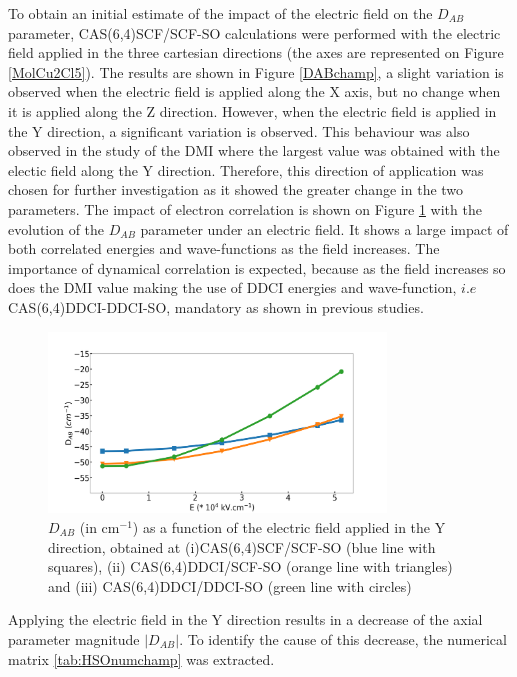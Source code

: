 \documentclass[10pt]{report}
\numberwithin{equation}{section}
\begin{document}
To obtain an initial estimate of the impact of the electric field on the $D_{AB}$ parameter, CAS(6,4)SCF/SCF-SO calculations were performed with the electric field applied in the three cartesian directions (the axes are represented on Figure \ref{MolCu2Cl5}).
The results are shown in Figure \ref{DABchamp}, a slight variation is observed when the electric field is applied along the X axis, but no change when it is applied along the Z direction.
However, when the electric field is applied in the Y direction, a significant variation is observed.
This behaviour was also observed in the study of the DMI where the largest value was obtained with the electic field along the Y direction.
Therefore, this direction of application was chosen for further investigation as it showed the greater change in the two parameters.
The impact of electron correlation is shown on Figure \ref{DABcorrelation} with the evolution of the $D_{AB}$ parameter under an electric field. 
It shows a large impact of both correlated energies and wave-functions as the field increases.
The importance of dynamical correlation is expected, because as the field increases so does the DMI value making the use of DDCI energies and wave-function, $i.e$ CAS(6,4)DDCI-DDCI-SO, mandatory as shown in previous studies.

\begin{figure}[!ht]
    \centering
    \includegraphics[width=0.8\textwidth]{Images/DABcorrelation.png}
    \caption{$D_{AB}$ (in cm$^{-1}$) as a function of the electric field applied in the Y direction, obtained at (i)CAS(6,4)SCF/SCF-SO (blue line with squares), (ii) CAS(6,4)DDCI/SCF-SO (orange line with triangles) and (iii) CAS(6,4)DDCI/DDCI-SO (green line with circles)}
    \label{DABcorrelation}
\end{figure}

Applying the electric field in the Y direction results in a decrease of the axial parameter magnitude $|D_{AB}|$.
To identify the cause of this decrease, the numerical matrix \ref{tab:HSOnumchamp} was extracted.
\end{document}
